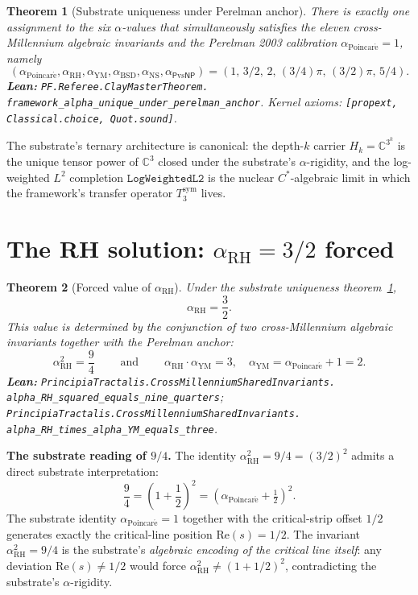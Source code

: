 \documentclass[11pt,a4paper]{article}
\theoremstyle{plain}
\newtheorem{theorem}{Theorem}[section]
\theoremstyle{definition}
\begin{document}
\begin{theorem}[Substrate uniqueness under Perelman anchor]
\label{thm:substrate-unique}
There is exactly one assignment to the six $\alpha$-values that
simultaneously satisfies the eleven cross-Millennium algebraic
invariants and the Perelman 2003 calibration
$\alpha_{\mathrm{Poincar\acute e}} = 1$, namely
\[
(\alpha_{\mathrm{Poincar\acute e}}, \alpha_{\mathrm{RH}},
\alpha_{\mathrm{YM}}, \alpha_{\mathrm{BSD}}, \alpha_{\mathrm{NS}},
\alpha_{\mathsf{P}\mathrm{vs}\mathsf{NP}}) = (1,\, 3/2,\, 2,\, (3/4)\pi,\,
(3/2)\pi,\, 5/4).
\]
\textbf{Lean:}
\texttt{PF.Referee.ClayMasterTheorem.\\
framework\_alpha\_unique\_under\_perelman\_anchor}.
Kernel axioms: \texttt{[propext, Classical.choice, Quot.sound]}.
\end{theorem}

The substrate's ternary architecture is canonical: the depth-$k$
carrier $H_{k} = \mathbb{C}^{3^{k}}$ is the unique tensor power of
$\mathbb{C}^{3}$ closed under the substrate's $\alpha$-rigidity, and the
log-weighted $L^{2}$ completion $\mathtt{LogWeightedL2}$ is the
nuclear $C^{*}$-algebraic limit in which the framework's transfer
operator $T_{3}^{\mathrm{sym}}$ lives.

\section{The RH solution: \texorpdfstring{$\alpha_{\mathrm{RH}} = 3/2$
forced}{alpha\_RH = 3/2 forced}}
\label{sec:rh-solution}

\begin{theorem}[Forced value of $\alpha_{\mathrm{RH}}$]
\label{thm:rh-forced}
Under the substrate uniqueness theorem~\ref{thm:substrate-unique},
\[
\alpha_{\mathrm{RH}} = \frac{3}{2}.
\]
This value is determined by the conjunction of two cross-Millennium
algebraic invariants together with the Perelman anchor:
\[
\boxed{\;\alpha_{\mathrm{RH}}^{2} = \frac{9}{4}\;}
\qquad\text{and}\qquad
\boxed{\;\alpha_{\mathrm{RH}} \cdot \alpha_{\mathrm{YM}} = 3,\quad
\alpha_{\mathrm{YM}} = \alpha_{\mathrm{Poincar\acute e}} + 1 = 2.\;}
\]
\textbf{Lean:}
\texttt{PrincipiaTractalis.CrossMillenniumSharedInvariants.\\
alpha\_RH\_squared\_equals\_nine\_quarters};
\texttt{PrincipiaTractalis.CrossMillenniumSharedInvariants.\\
alpha\_RH\_times\_alpha\_YM\_equals\_three}.
\end{theorem}

\textbf{The substrate reading of $9/4$.}
The identity $\alpha_{\mathrm{RH}}^{2} = 9/4 = (3/2)^{2}$ admits a
direct substrate interpretation:
\[
\frac{9}{4} = \left(1 + \frac{1}{2}\right)^{2} =
\left(\alpha_{\mathrm{Poincar\acute e}} + \tfrac{1}{2}\right)^{2}.
\]
The substrate identity $\alpha_{\mathrm{Poincar\acute e}} = 1$ together
with the critical-strip offset $1/2$ generates exactly the critical-line
position $\mathrm{Re}(s) = 1/2$. The invariant
$\alpha_{\mathrm{RH}}^{2} = 9/4$ is the substrate's
\emph{algebraic encoding of the critical line itself}: any deviation
$\mathrm{Re}(s) \ne 1/2$ would force
$\alpha_{\mathrm{RH}}^{2} \ne (1 + 1/2)^{2}$, contradicting the
substrate's $\alpha$-rigidity.
\end{document}
